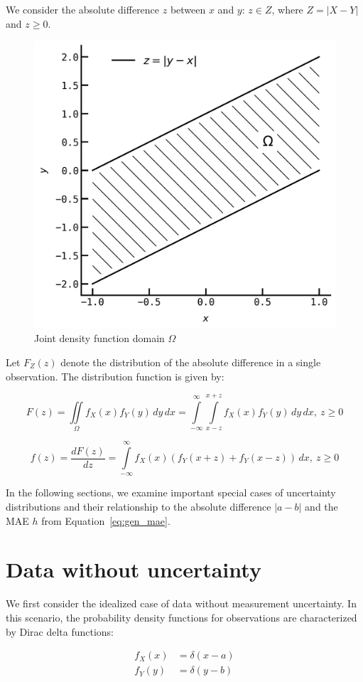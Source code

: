 \documentclass[12pt,a4paper]{article}
\theoremstyle{definition}
\begin{document}
We consider the absolute difference $z$ between $x$ and $y$: $z \in Z$, where $Z = \left| X - Y \right|$ and $z \geq 0$.


\begin{figure}[H]
	\centering
	\includegraphics[width=0.5\linewidth]{img/abs_err_area}
	\caption{Joint density function domain $\Omega$}
	\label{fig:z-area}
\end{figure}


Let $F_Z(z)$ denote the distribution of the absolute difference in a single observation. The distribution function is given by:

\begin{equation}
	F(z) = \iint\limits_\Omega f_X(x) f_Y(y) \,dy\,dx = \int\limits_{-\infty}^{\infty} \int\limits_{x-z}^{x+z} f_X(x) f_Y(y) \,dy\,dx, ~ z \geq 0
	\label{eq:Fz}
\end{equation}

\begin{equation}
	f(z) = \frac{dF(z)}{dz} = \int\limits_{-\infty}^{\infty} f_X(x)\left( f_Y(x+z) + f_Y(x-z) \right)\,dx,~ z \geq 0
	\label{eq:fz}
\end{equation}

In the following sections, we examine important special cases of uncertainty distributions and their relationship to the absolute difference $|a-b|$ and the MAE $h$ from Equation~\ref{eq:gen_mae}.

\section{Data without uncertainty}

We first consider the idealized case of data without measurement uncertainty. In this scenario, the probability density functions for observations are characterized by Dirac delta functions:

\begin{equation}
	\begin{aligned}
		f_X(x) &= \delta(x-a) \\
		f_Y(y) &= \delta(y-b)
	\end{aligned}
	\label{eq:delta_ab}
\end{equation}
\end{document}

